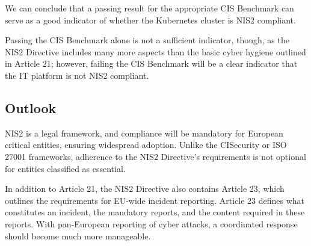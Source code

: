 We can conclude that a passing result for the appropriate CIS Benchmark can serve as a good indicator of whether the Kubernetes cluster is NIS2 compliant.

Passing the CIS Benchmark alone is not a sufficient indicator, though, as the NIS2 Directive includes many more aspects than the basic cyber hygiene outlined in Article 21; however, failing the CIS Benchmark will be a clear indicator that the IT platform is not NIS2 compliant.

\subsection{Outlook}

NIS2 is a legal framework, and compliance will be mandatory for European critical entities, ensuring widespread adoption. Unlike the CISecurity or ISO 27001 frameworks, adherence to the NIS2 Directive's requirements is not optional for entities classified as essential.

In addition to Article 21, the NIS2 Directive also contains Article 23, which outlines the requirements for EU-wide incident reporting. Article 23 defines what constitutes an incident, the mandatory reports, and the content required in these reports. With pan-European reporting of cyber attacks, a coordinated response should become much more manageable.
